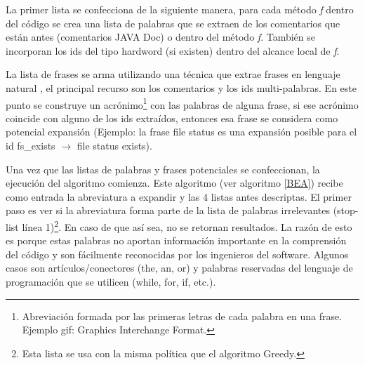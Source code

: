 \documentclass[a4paper,12pt]{report}
\begin{document}
La primer lista se confecciona de la siguiente manera, para cada método \textit{f} dentro del código se crea una lista de palabras que se extraen de los comentarios que están antes (comentarios JAVA Doc) o dentro del método \textit{f}. También se incorporan los ids del tipo hardword (si existen) dentro del alcance local de \textit{f}. 

La lista de frases se arma utilizando una técnica que extrae frases en lenguaje natural \cite{FFCW01}, el principal recurso son los comentarios y los ids multi-palabras. En este punto se construye un acrónimo\footnote[1]{Abreviación formada por las primeras letras de cada palabra en una frase. Ejemplo gif: Graphics Interchange Format.} con las palabras de alguna frase, si ese acrónimo coincide con alguno de los ids extraídos, entonces esa frase se considera como potencial expansión (Ejemplo: la frase \textsf{file status} es una expansión posible para el id \textsf{fs\_exists} $\rightarrow$ \textsf{file status exists}).

Una vez que las listas de palabras y frases potenciales se confeccionan, la ejecución del algoritmo comienza. Este algoritmo (ver algoritmo \ref{BEA}) recibe como entrada la abreviatura a expandir y las 4 listas antes descriptas. El primer paso es ver si la abreviatura forma parte de la lista de palabras irrelevantes (stop-list línea 1)\footnote[2]{Esta lista se usa con la misma política que el algoritmo Greedy.}. En caso de que así sea, no se retornan resultados. La razón de esto es porque estas palabras no aportan información importante en la comprensión del código y son fácilmente reconocidas por los ingenieros del software. Algunos casos son artículos/conectores (the, an, or) y palabras reservadas del lenguaje de programación que se utilicen (\textsf{while, for, if,} etc.).
\end{document}
